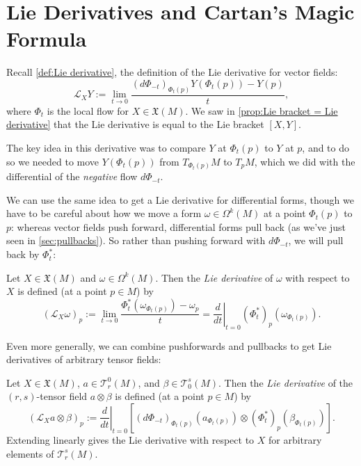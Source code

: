
\section{Lie Derivatives and Cartan's Magic Formula}

Recall \cref{def:Lie derivative}, the definition of the Lie derivative for vector fields:
\[
	\mathcal{L}_XY := \lim_{t \to 0} \frac{(d\Phi_{-t})_{\Phi_t(p)}Y(\Phi_t(p))-Y(p)}{t},
\]
where $\Phi_t$ is the local flow for $X \in \mathfrak{X}(M)$. We saw in \cref{prop:Lie bracket = Lie derivative} that the Lie derivative is equal to the Lie bracket $[X,Y]$.

The key idea in this derivative was to compare $Y$ at $\Phi_t(p)$ to $Y$ at $p$, and to do so we needed to move $Y(\Phi_t(p))$ from $T_{\Phi_t(p)}M$ to $T_pM$, which we did with the differential of the \emph{negative} flow $d\Phi_{-t}$.

We can use the same idea to get a Lie derivative for differential forms, though we have to be careful about how we move a form $\omega \in \Omega^k(M)$ at a point $\Phi_t(p)$ to $p$: whereas vector fields push forward, differential forms pull back (as we've just seen in \cref{sec:pullbacks}). So rather than pushing forward with $d\Phi_{-t}$, we will pull back by $\Phi_t^\ast$:

\begin{definition}\label{def:Lie derivative of differential form}
	Let $X \in \mathfrak{X}(M)$ and $\omega \in \Omega^k(M)$. Then the \emph{Lie derivative} of $\omega$ with respect to $X$ is defined (at a point $p \in M$) by
	\[
		\left(\mathcal{L}_X\omega\right)_p := \lim_{t \to 0} \frac{\Phi_t^\ast(\omega_{\Phi_t(p)})-\omega_p}{t} = \left. \frac{d}{dt}\right|_{t=0} \left(\Phi_t^\ast\right)_p(\omega_{\Phi_t(p)}).
	\]
\end{definition}

Even more generally, we can combine pushforwards and pullbacks to get Lie derivatives of arbitrary tensor fields:

\begin{definition}\label{def:Lie derivative of tensor fields}
	Let $X \in \mathfrak{X}(M)$, $a \in \mathcal{T}_r^0(M)$, and $\beta \in \mathcal{T}_0^s(M)$. Then the \emph{Lie derivative} of the $(r,s)$-tensor field $a \otimes \beta$ is defined (at a point $p \in M$) by
	\[
		\left( \mathcal{L}_X a \otimes \beta\right)_p := \left. \frac{d}{dt} \right|_{t=0} \left[ \left(d\Phi_{-t}\right)_{\Phi_t(p)} \left(a _{\Phi_t(p)} \right) \otimes \left(\Phi_t^\ast\right)_p\left(\beta_{\Phi_t(p)}\right)\right].
	\]
	Extending linearly gives the Lie derivative with respect to $X$ for arbitrary elements of $\mathcal{T}_r^s(M)$.
\end{definition}

